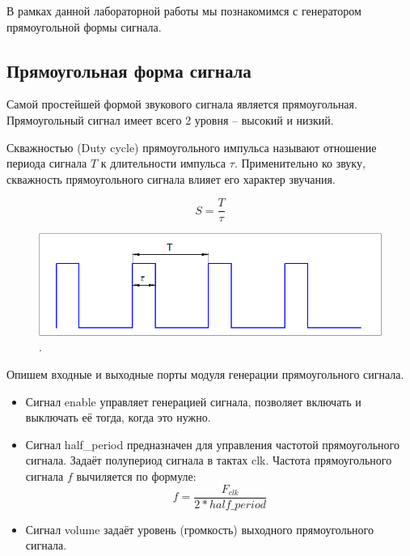 В рамках данной лабораторной работы мы познакомимся с генератором прямоугольной формы сигнала.


\subsection{Прямоугольная форма сигнала}

Самой простейшей формой звукового сигнала является прямоугольная. Прямоугольный сигнал имеет всего 2 уровня -- высокий и низкий. 


Скважностью (Duty cycle) прямоугольного импульса называют отношение периода сигнала $T$ к длительности импульса $\tau$. Применительно ко звуку, скважность прямоугольного сигнала влияет его характер звучания.

$$ S = \frac{T}{\tau} $$


\begin{figure}[H]
	\centering
	\includegraphics [width=1\textwidth] {images/lab_7/duty_cycle.png}
	\caption{.}
	\label{lab7:pic2}
\end{figure}


Опишем входные и выходные порты модуля генерации прямоугольного сигнала.

\noindent
\begin{minipage}{\linewidth}
	
\end{minipage}

\begin{itemize}
	\item Сигнал enable управляет генерацией сигнала, позволяет включать и выключать её тогда, когда это нужно.
	\item Сигнал half\_period предназначен для управления частотой прямоугольного сигнала. Задаёт полупериод сигнала в тактах clk. Частота прямоугольного сигнала $f$ вычиляется по формуле: 
	$$ f = \frac{F_{clk}}{2* half\_period} $$
	\item Сигнал volume задаёт уровень (громкость) выходного прямоугольного сигнала.

\end{itemize}

